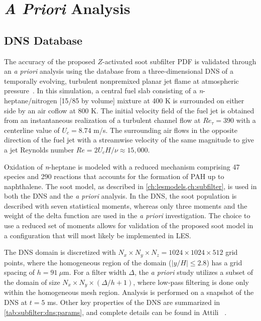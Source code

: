 \section{\textit{A Priori} Analysis}
\label{sec:subfilter:dns}

\subsection{DNS Database}
\label{sec:subfilter:dns:database}

The accuracy of the proposed $Z$-activated soot subfilter PDF is validated through an \textit{a priori} analysis using the database from a three-dimensional DNS of a temporally evolving, turbulent nonpremixed planar jet flame at atmospheric pressure~\cite{attili2014}. In this simulation, a central fuel slab consisting of a \textit{n}-heptane/nitrogen [15/85 by volume] mixture at 400 K is surrounded on either side by an air coflow at 800 K. The initial velocity field of the fuel jet is obtained from an instantaneous realization of a turbulent channel flow at $Re_{\tau} = 390$ with a centerline value of $U_c = 8.74$ m/s. The surrounding air flows in the opposite direction of the fuel jet with a streamwise velocity of the same magnitude to give a jet Reynolds number $Re = 2U_c H/\nu \approx 15,000$.

Oxidation of \textit{n}-heptane is modeled with a reduced mechanism comprising 47 species and 290 reactions that accounts for the formation of PAH up to naphthalene. The soot model, as described in \cref{ch:lesmodels,ch:subfilter}, is used in both the DNS and the \textit{a priori} analysis. In the DNS, the soot population is described with seven statistical moments, whereas only three moments and the weight of the delta function are used in the \textit{a priori} investigation. The choice to use a reduced set of moments allows for validation of the proposed soot model in a configuration that will most likely be implemented in LES.

The DNS domain is discretized with $N_x \times N_y \times N_z = 1024 \times 1024 \times 512$ grid points, where the homogeneous region of the domain ($|y/H| \le 2.8$) has a grid spacing of $h = 91\ \mu$m. For a filter width $\Delta$, the \textit{a priori} study utilizes a subset of the domain of size $N_x \times N_y \times (\Delta/h + 1)$, where low-pass filtering is done only within the homogeneous mesh region. Analysis is performed on a snapshot of the DNS at $t = 5$ ms. Other key properties of the DNS are summarized in \cref{tab:subfilter:dns:params}, and complete details can be found in Attili \etal~\cite{attili2014}.


